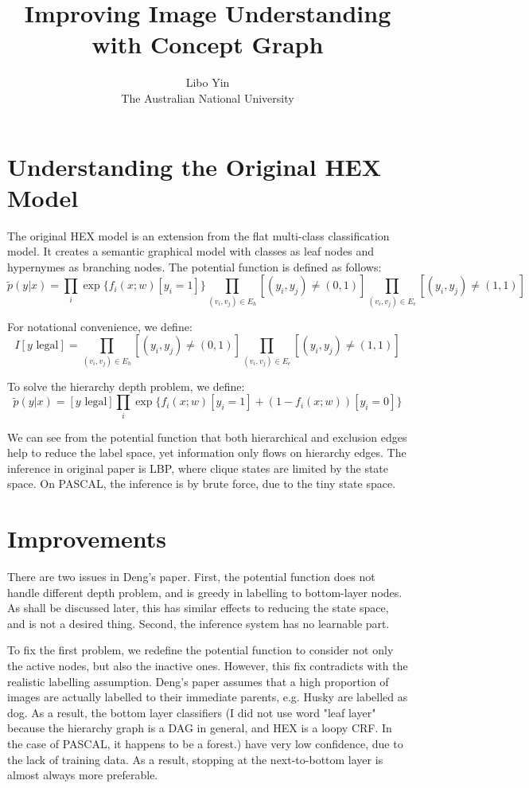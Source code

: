 \documentclass[11pt,a4paper]{article}
\begin{document}
\title{Improving Image Understanding with Concept Graph}
\author{Libo Yin\\The Australian National University}
\maketitle
\section{Understanding the Original HEX Model}

The original HEX model is an extension from the flat multi-class classification model. It creates a semantic graphical model with classes as leaf nodes and hypernymes as branching nodes. The potential function is defined as follows:
\[\tilde{p}(y|x)=\prod_i\exp\{f_i(x;w)[y_i=1]\}\prod_{(v_i,v_j)\in E_h}[(y_i,y_j)\neq(0,1)]\prod_{(v_i,v_j)\in E_e}[(y_i,y_j)\neq(1,1)]\]

For notational convenience, we define:
\[I[y\text{ legal}]=\prod_{(v_i,v_j)\in E_h}[(y_i,y_j)\neq(0,1)]\prod_{(v_i,v_j)\in E_e}[(y_i,y_j)\neq(1,1)]\]

To solve the hierarchy depth problem, we define:
\[\tilde{p}(y|x)=[y\text{ legal}]\prod_i\exp\{f_i(x;w)[y_i=1]+(1-f_i(x;w))[y_i=0]\}\]

We can see from the potential function that both hierarchical and exclusion edges help to reduce the label space, yet information only flows on hierarchy edges. The inference in original paper is LBP, where clique states are limited by the state space. On PASCAL, the inference is by brute force, due to the tiny state space.

\section{Improvements}

There are two issues in Deng's paper. First, the potential function does not handle different depth problem, and is greedy in labelling to bottom-layer nodes. As shall be discussed later, this has similar effects to reducing the state space, and is not a desired thing. Second, the inference system has no learnable part.

To fix the first problem, we redefine the potential function to consider not only the active nodes, but also the inactive ones. However, this fix contradicts with the realistic labelling assumption. Deng's paper assumes that a high proportion of images are actually labelled to their immediate parents, e.g. Husky are labelled as dog. As a result, the bottom layer classifiers (I did not use word "leaf layer" because the hierarchy graph is a DAG in general, and HEX is a loopy CRF. In the case of PASCAL, it happens to be a forest.) have very low confidence, due to the lack of training data. As a result, stopping at the next-to-bottom layer is almost always more preferable.
\end{document}
